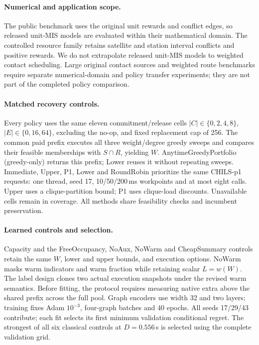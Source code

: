 \paragraph{Numerical and application scope.}
The public benchmark uses the original unit rewards and conflict edges,
so released unit-MIS models are evaluated within their mathematical domain.
The controlled resource family retains satellite and station interval
conflicts and positive rewards. We do not extrapolate released unit-MIS
models to weighted contact scheduling. Large original contact sources and
weighted route benchmarks require separate numerical-domain and policy
transfer experiments; they are not part of the completed policy comparison.

\paragraph{Matched recovery controls.}
Every policy uses the same eleven commitment/release cells
$|C|\in\{0,2,4,8\}$, $|E|\in\{0,16,64\}$, excluding the no-op, and
fixed replacement cap of 256. The common paid prefix executes all three
weight/degree greedy sweeps and compares their feasible memberships with
$S\cap R$, yielding $W$. AnytimeGreedyPortfolio (greedy-only) returns this prefix;
Lower reuses it without repeating sweeps. Immediate, Upper, P1, Lower and
RoundRobin prioritize the same CHILS-p1 requests: one thread, seed 17,
10/50/200\,ms workpoints and at most eight calls. Upper uses a
clique-partition bound; P1 uses clique-load discounts. Unavailable cells remain
in coverage. All methods share
feasibility checks and incumbent preservation.

\paragraph{Learned controls and selection.}
Capacity and the FreeOccupancy, NoAux, NoWarm and CheapSummary controls
retain the same $W$, lower and upper bounds, and execution options.
NoWarm masks warm indicators and warm fraction while retaining scalar
$L=w(W)$. The label design clones two actual execution snapshots under
the revised warm semantics. Before fitting, the protocol requires measuring
native extra above the shared prefix across the full pool. Graph encoders
use width 32 and two layers; training fixes Adam $10^{-3}$,
four-graph batches and 40 epochs. All seeds 17/29/43 contribute;
each fit selects its first minimum validation
conditional regret. The strongest of all six classical controls at
$D=0.556$\,s is selected using the complete validation grid.

